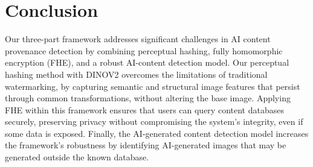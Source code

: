 
        


\vspace{0.2cm}
\section{Conclusion}
Our three-part framework addresses significant challenges in AI content provenance detection by combining perceptual hashing, fully homomorphic encryption (FHE), and a robust AI-content detection model. Our perceptual hashing method with DINOV2 overcomes the limitations of traditional watermarking, by capturing semantic and structural image features that persist through common transformations, without altering the base image. Applying FHE within this framework ensures that users can query content databases securely, preserving privacy without compromising the system's integrity, even if some data is exposed. Finally, the AI-generated content detection model increases the framework’s robustness by identifying AI-generated images that may be generated outside the known database.

\clearpage